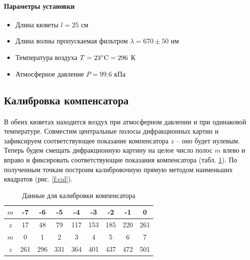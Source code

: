 \documentclass[a4paper,12pt]{article} %
\begin{document}
\paragraph{Параметры установки}

\begin{itemize}
\renewcommand{\labelitemi}{$\triangleright$}
\item Длина кюветы $l = 25$ см
\item Длина волны пропускаемая фильтром $\lambda = 670 \pm 50$ нм
\item Температура воздуха $T = 23\degree \text{C} = 296$ К
\item Атмосферное давление $P = 99.6$ кПа
\end{itemize}

\subsection{Калибровка компенсатора}

\paragraph{} В обеих кюветах находится воздух при атмосферном давлении и при одинаковой температуре. Совместим центральные полосы дифракционных картин и зафиксируем соответствующее показание компенсатора $z$ -- оно будет нулевым. Теперь будем смещать дифракционную картину на целое число полос $m$ влево и вправо и фиксировать соответствующие показания компенсатора (табл. \ref{t:cal}). По полученным точкам построим калибровочную прямую методом наименьших квадратов (рис. \ref{f:cal}). 

\begin{table}
\centering
\begin{tabular}{|c|c|c|c|c|c|c|c|c|}
\hline 
$m$ & -7 & -6 & -5 & -4 & -3 & -2 & -1 & 0\\
\hline
$z$ & 17 & 48 & 79 & 117 & 153 & 185 & 220 & 261\\
\hline
$m$ & 0 & 1 & 2 & 3 & 4 & 5 & 6 & 7\\
\hline
$z$ & 261 & 296 & 331 & 364 & 401 & 437 & 472 & 501\\
\hline 
\end{tabular} 
\caption{Данные для калибровки компенсатора}
\label{t:cal}
\end{table}
\end{document}

